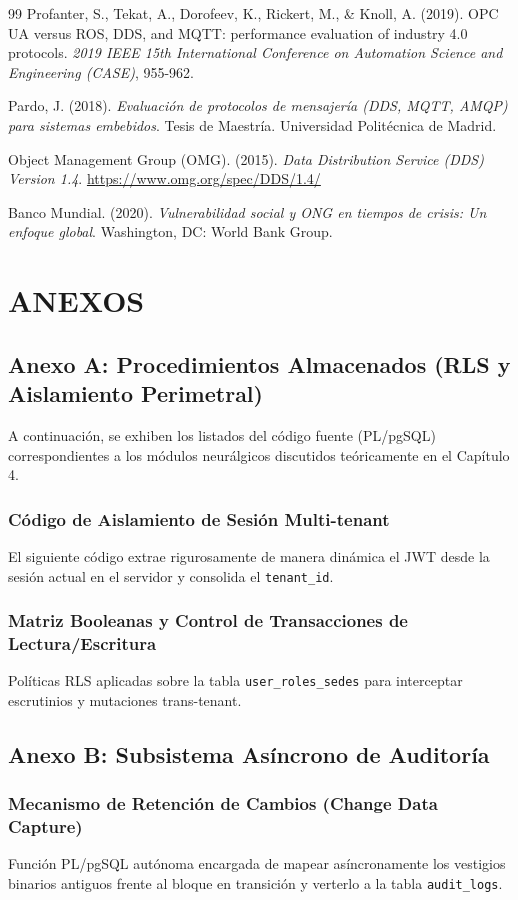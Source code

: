\documentclass[11pt,a4paper,oneside]{report}
\begin{document}
\begin{thebibliography}{99}
Profanter, S., Tekat, A., Dorofeev, K., Rickert, M., \& Knoll, A. (2019). OPC UA versus ROS, DDS, and MQTT: performance evaluation of industry 4.0 protocols. \textit{2019 IEEE 15th International Conference on Automation Science and Engineering (CASE)}, 955-962.

Pardo, J. (2018). \textit{Evaluaci\'on de protocolos de mensajer\'ia (DDS, MQTT, AMQP) para sistemas embebidos}. Tesis de Maestr\'ia. Universidad Polit\'ecnica de Madrid.

Object Management Group (OMG). (2015). \textit{Data Distribution Service (DDS) Version 1.4}. \url{https://www.omg.org/spec/DDS/1.4/}

Banco Mundial. (2020). \textit{Vulnerabilidad social y ONG en tiempos de crisis: Un enfoque global}. Washington, DC: World Bank Group.

\end{thebibliography}

\appendix
\chapter*{ANEXOS}
\renewcommand{\thesection}{\Alph{section}}
\setcounter{section}{0}

\section{Anexo A: Procedimientos Almacenados (RLS y Aislamiento Perimetral)}
A continuaci\'on, se exhiben los listados del c\'odigo fuente (PL/pgSQL) correspondientes a los m\'odulos neur\'algicos discutidos te\'oricamente en el Cap\'itulo 4.

\subsection{C\'odigo de Aislamiento de Sesi\'on Multi-tenant}
El siguiente c\'odigo extrae rigurosamente de manera din\'amica el JWT desde la sesi\'on actual en el servidor y consolida el \texttt{tenant\_id}.

\subsection{Matriz Booleanas y Control de Transacciones de Lectura/Escritura}
Pol\'iticas RLS aplicadas sobre la tabla \texttt{user\_roles\_sedes} para interceptar escrutinios y mutaciones trans-tenant.

\section{Anexo B: Subsistema As\'incrono de Auditor\'ia}
\subsection{Mecanismo de Retenci\'on de Cambios (Change Data Capture)}
Funci\'on PL/pgSQL aut\'onoma encargada de mapear as\'incronamente los vestigios binarios antiguos frente al bloque en transici\'on y verterlo a la tabla \texttt{audit\_logs}.
\end{document}
